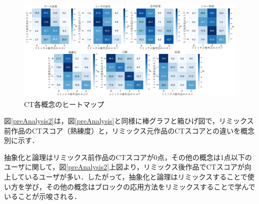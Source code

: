 \documentclass[submit,techrep,noauthor]{ipsj}
\newcommand{\todo}[1]{\colorbox{yellow}{{\bf TODO}:}{\color{red} {\textbf{[#1]}}}}
\begin{document}
\begin{figure}[t]
  \centering
  \includegraphics[width=\textwidth]{@IPSJ_SIGSE202511_Horio/fig/heatmapCTf.pdf}
  \caption{CT各概念のヒートマップ}
  \label{heatmap}
\end{figure}

図\ref{preAnalysis2}は，図\ref{preAnalysis}と同様に棒グラフと箱ひげ図で，リミックス前作品のCTスコア（熟練度）と，リミックス元作品のCTスコアとの違いを概念別に示す．




抽象化と論理はリミックス前作品のCTスコアが0点，その他の概念は1点以下のユーザに関して，図\ref{preAnalysis2}上図より，リミックス後作品でCTスコアが向上しているユーザが多い．したがって，抽象化と論理はリミックスすることで使い方を学び，その他の概念はブロックの応用方法をリミックスすることで学んでいることが示唆される．
\end{document}
